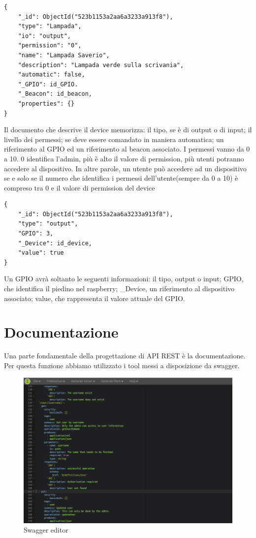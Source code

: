 \begin{lstlisting}[caption={Device collection}, style=javaScriptCode]
{
    "_id": ObjectId("523b1153a2aa6a3233a913f8"),
    "type": "Lampada",
    "io": "output",
    "permission": "0",
    "name": "Lampada Saverio",
    "description": "Lampada verde sulla scrivania",
    "automatic": false,
    "_GPIO": id_GPIO.
    "_Beacon": id_beacon,
    "properties": {}
}
\end{lstlisting}

Il documento che descrive il device memorizza: il tipo, se è di output o di input; il livello dei permessi; se deve essere comandato in maniera automatica; un riferimento al GPIO ed un riferimento al beacon associato. 
I permessi vanno da 0 a 10.
0 identifica l'admin, più è alto il valore di permission, più utenti potranno accedere al dispositivo.
In altre parole, un utente può accedere ad un dispositivo se e solo se il numero che identifica i permessi dell'utente(sempre da 0 a 10) è compreso tra 0 e il valore di permission del device  

\begin{lstlisting}[caption={GPIO collection}, style=javaScriptCode]
{
    "_id": ObjectId("523b1153a2aa6a3233a913f8"),
    "type": "output",
    "GPIO": 3,
    "_Device": id_device,
    "value": true
}
\end{lstlisting}

Un GPIO avrà soltanto le seguenti informazioni: il tipo, output o input; GPIO, che identifica il piedino nel raspberry; \_Device, un riferimento al dispositivo associato; value, che rappresenta il valore attuale del GPIO.

\section{Documentazione}
Una parte fondamentale della progettazione di API REST è la documentazione.
Per questa funzione abbiamo utilizzato i tool messi a disposizione da swagger\cite{swagger}.
\begin{figure}[htbp]
\centering
\includegraphics[scale=0.45]{Immagini/swagger-editor.png}
\caption{Swagger editor} 
\end{figure}\\


